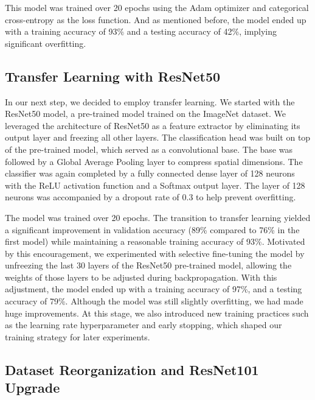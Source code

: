 \documentclass[conference]{IEEEtran}
\begin{document}
This model was trained over 20 epochs using the Adam optimizer and categorical cross-entropy as the loss function. And as mentioned before, the model ended up with a training accuracy of 93\% and a testing accuracy of 42\%, implying significant overfitting.

\subsection{\large Transfer Learning with ResNet50}

In our next step, we decided to employ transfer learning. We started with the ResNet50 model, a pre-trained model trained on the ImageNet dataset. We leveraged the architecture of ResNet50 as a feature extractor by eliminating its output layer and freezing all other layers. The classification head was built on top of the pre-trained model, which served as a convolutional base. The base was followed by a Global Average Pooling layer to compress spatial dimensions. The classifier was again completed by a fully connected dense layer of 128 neurons with the ReLU activation function and a Softmax output layer. The layer of 128 neurons was accompanied by a dropout rate of 0.3 to help prevent overfitting.

The model was trained over 20 epochs. The transition to transfer learning yielded a significant improvement in validation accuracy (89\% compared to 76\% in the first model) while maintaining a reasonable training accuracy of 93\%. Motivated by this encouragement, we experimented with selective fine-tuning the model by unfreezing the last 30 layers of the ResNet50 pre-trained model, allowing the weights of those layers to be adjusted during backpropagation. With this adjustment, the model ended up with a training accuracy of 97\%, and a testing accuracy of 79\%. Although the model was still slightly overfitting, we had made huge improvements. At this stage, we also introduced new training practices such as the learning rate hyperparameter and early stopping, which shaped our training strategy for later experiments.

\subsection{\large Dataset Reorganization and ResNet101 Upgrade}
\end{document}
